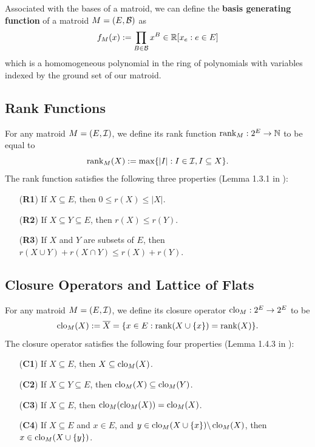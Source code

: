 \documentclass{puthesis-UG}
\begin{document}
Associated with the bases of a matroid, we can define the \textbf{basis generating function} of a matroid $M = (E, \mathcal{B})$ as
\[
	f_M (x) := \prod_{B \in \mathcal{B}} x^B \in \mathbb{R}[x_e : e \in E]
\]
which is a homomogeneous polynomial in the ring of polynomials with variables indexed by the ground set of our matroid. 

\subsection{Rank Functions}

\begin{defn}
	For any matroid $M = (E, \mathcal{I})$, we define its rank function $\operatorname{rank}_M : 2^E \to \mathbb{N}$ to be equal to
	\[
		\operatorname{rank}_M(X) := \max \{|I| : I \in \mathcal{I}, I \subseteq X\}.
	\]
	The rank function satisfies the following three properties (Lemma 1.3.1 in \cite{10.5555/1197093}):
	\begin{enumerate}
		\item[(\textbf{R1})] If $X \subseteq E$, then $0 \leq r(X) \leq |X|$. 
		\item[(\textbf{R2})] If $X \subseteq Y \subseteq E$, then $r(X) \leq r(Y)$. 
		\item[(\textbf{R3})] If $X$ and $Y$ are subsets of $E$, then $r(X \cup Y) + r(X \cap Y) \leq r(X) + r(Y)$.
	\end{enumerate}
\end{defn}


\subsection{Closure Operators and Lattice of Flats}

\begin{defn}
	For any matroid $M = (E, \mathcal{I})$, we define its closure operator $\operatorname{clo}_M : 2^E \to 2^E$ to be 
	\[
		\operatorname{clo}_M (X) := \overline{X} = \{x \in E : \operatorname{rank} (X \cup \{x\}) = \operatorname{rank} (X) \}.
	\]
	The closure operator satisfies the following four properties (Lemma 1.4.3 in \cite{10.5555/1197093}):
	\begin{enumerate}
		\item[(\textbf{C1})] If $X \subseteq E$, then $X \subseteq \operatorname{clo}_M (X)$. 
		\item[(\textbf{C2})] If $X \subseteq Y \subseteq E$, then $\operatorname{clo}_M (X) \subseteq \operatorname{clo}_M (Y)$. 
		\item[(\textbf{C3})] If $X \subseteq E$, then $\operatorname{clo}_M (\operatorname{clo}_M(X)) = \operatorname{clo}_M(X)$. 
		\item[(\textbf{C4})] If $X \subseteq E$ and $x \in E$, and $y \in \operatorname{clo}_M(X \cup \{x\}) \backslash \operatorname{clo}_M(X)$, then $x \in \operatorname{clo}_M(X \cup \{y\})$. 
	\end{enumerate}
\end{defn}
\end{document}
